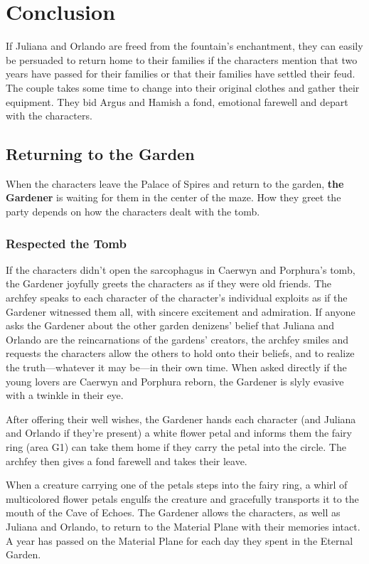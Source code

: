 \documentclass[10pt,a4paper,twoside,bg=print,twocolumn,openany,nodeprecatedcode]{dndbook}
\begin{document}
\section{Conclusion}
If Juliana and Orlando are freed from the fountain's enchantment, they can easily be persuaded to return home to their families if the characters mention that two years have passed for their families or that their families have settled their feud. The couple takes some time to change into their original clothes and gather their equipment. They bid Argus and Hamish a fond, emotional farewell and depart with the characters.

\subsection{Returning to the Garden}
When the characters leave the Palace of Spires and return to the garden, \textbf{the Gardener} is waiting for them in the center of the maze. How they greet the party depends on how the characters dealt with the tomb.

\subsubsection{Respected the Tomb}
If the characters didn't open the sarcophagus in Caerwyn and Porphura's tomb, the Gardener joyfully greets the characters as if they were old friends. The archfey speaks to each character of the character's individual exploits as if the Gardener witnessed them all, with sincere excitement and admiration. If anyone asks the Gardener about the other garden denizens' belief that Juliana and Orlando are the reincarnations of the gardens' creators, the archfey smiles and requests the characters allow the others to hold onto their beliefs, and to realize the truth—whatever it may be—in their own time. When asked directly if the young lovers are Caerwyn and Porphura reborn, the Gardener is slyly evasive with a twinkle in their eye.

After offering their well wishes, the Gardener hands each character (and Juliana and Orlando if they're present) a white flower petal and informs them the fairy ring (area G1) can take them home if they carry the petal into the circle. The archfey then gives a fond farewell and takes their leave.

When a creature carrying one of the petals steps into the fairy ring, a whirl of multicolored flower petals engulfs the creature and gracefully transports it to the mouth of the Cave of Echoes. The Gardener allows the characters, as well as Juliana and Orlando, to return to the Material Plane with their memories intact. A year has passed on the Material Plane for each day they spent in the Eternal Garden.
\end{document}
